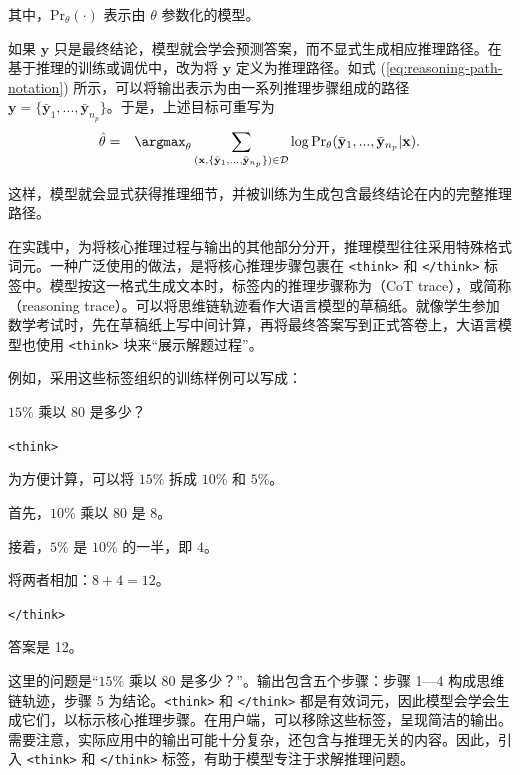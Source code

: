\noindent 其中，$\mathrm{Pr}_{\theta}(\cdot)$ 表示由 $\theta$ 参数化的模型。

如果 $\mathbf{y}$ 只是最终结论，模型就会学会预测答案，而不显式生成相应推理路径。在基于推理的训练或调优中，改为将 $\mathbf{y}$ 定义为推理路径。如式 (\ref{eq:reasoning-path-notation}) 所示，可以将输出表示为由一系列推理步骤组成的路径 $\mathbf{y} = \{\bar{\mathbf{y}}_1,...,\bar{\mathbf{y}}_{n_p}\}$。于是，上述目标可重写为
\begin{eqnarray}
\hat{\theta} & = & \argmax_{\theta} \sum_{(\mathbf{x}, \{\bar{\mathbf{y}}_1,...,\bar{\mathbf{y}}_{n_p}\}) \in \mathcal{D}} \log \mathrm{Pr}_{\theta} (\bar{\mathbf{y}}_1,...,\bar{\mathbf{y}}_{n_p}|\mathbf{x}).
\end{eqnarray}

\noindent 这样，模型就会显式获得推理细节，并被训练为生成包含最终结论在内的完整推理路径。

在实践中，为将核心推理过程与输出的其他部分分开，推理模型往往采用特殊格式词元。一种广泛使用的做法，是将核心推理步骤包裹在 \texttt{<think>} 和 \texttt{</think>} 标签中。模型按这一格式生成文本时，标签内的推理步骤称为（CoT trace），或简称（reasoning trace）。可以将思维链轨迹看作大语言模型的草稿纸。就像学生参加数学考试时，先在草稿纸上写中间计算，再将最终答案写到正式答卷上，大语言模型也使用 \texttt{<think>} 块来“展示解题过程”。

例如，采用这些标签组织的训练样例可以写成：

\vspace{0.5em}
\begin{tcolorbox}
\begingroup
\setlength{\leftskip}{2em}
\setlength{\rightskip}{2em}

$15\%$ 乘以 $80$ 是多少？

\vspace{0.3em}

\texttt{<think>}

为方便计算，可以将 $15\%$ 拆成 $10\%$ 和 $5\%$。

首先，$10\%$ 乘以 $80$ 是 $8$。

接着，$5\%$ 是 $10\%$ 的一半，即 $4$。

将两者相加：$8 + 4 = 12$。

\texttt{</think>}

答案是 12。

\endgroup
\end{tcolorbox}
\vspace{0.5em}

这里的问题是“$15\%$ 乘以 $80$ 是多少？”。输出包含五个步骤：步骤 1—4 构成思维链轨迹，步骤 5 为结论。\texttt{<think>} 和 \texttt{</think>} 都是有效词元，因此模型会学会生成它们，以标示核心推理步骤。在用户端，可以移除这些标签，呈现简洁的输出。需要注意，实际应用中的输出可能十分复杂，还包含与推理无关的内容。因此，引入 \texttt{<think>} 和 \texttt{</think>} 标签，有助于模型专注于求解推理问题。

